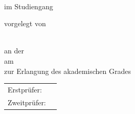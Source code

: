 \begin{titlepage}
  \centering


  \vspace{20mm}
  {\huge{\getDoctype{}}}\\

  {\large im Studiengang \getCourseOfStudies{}}

  \vspace{15mm}
  {\huge\bfseries \getTitle{}}

  \vspace*{15mm}
  vorgelegt von 

  {\large \getAuthor{}} \\
  an der \getUniversity{} \\
  am \getSubmissionDate{} \\

  \vspace{5mm}
  zur Erlangung des akademischen Grades \\
  \getAcademicDegree{}

  \vspace{15mm}
  \begin{tabular}{l l}
    Erstprüfer:      & \getSupervisor{} \\
    Zweitprüfer:     & \getAdvisor{} \\
  \end{tabular}

\end{titlepage}
